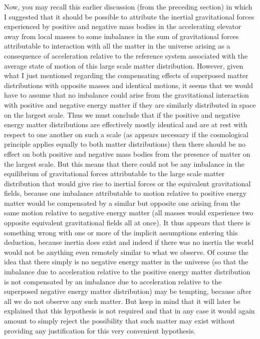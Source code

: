 \documentclass[notitlepage,12pt]{report}
\begin{document}
Now, you may recall this earlier discussion (from the preceding section) in which I suggested that it should be possible to attribute the inertial gravitational forces experienced by positive and negative mass bodies in the accelerating elevator away from local masses to some imbalance in the sum of gravitational forces attributable to interaction with all the matter in the universe arising as a consequence of acceleration relative to the reference system associated with the average state of motion of this large scale matter distribution. However, given what I just mentioned regarding the compensating effects of superposed matter distributions with opposite masses and identical motions, it seems that we would have to assume that no imbalance could arise from the gravitational interaction with positive and negative energy matter if they are similarly distributed in space on the largest scale. Thus we must conclude that if the positive and negative energy matter distributions are effectively mostly identical and are at rest with respect to one another on such a scale (as appears necessary if the cosmological principle applies equally to both matter distributions) then there should be no effect on both positive and negative mass bodies from the presence of matter on the largest scale. But this means that there could not be any imbalance in the equilibrium of gravitational forces attributable to the large scale matter distribution that would give rise to inertial forces or the equivalent gravitational fields, because one imbalance attributable to motion relative to positive energy matter would be compensated by a similar but opposite one arising from the same motion relative to negative energy matter (all masses would experience two opposite equivalent gravitational fields all at once). It thus appears that there is something wrong with one or more of the implicit assumptions entering this deduction, because inertia does exist and indeed if there was no inertia the world would not be anything even remotely similar to what we observe. Of course the idea that there simply is no negative energy matter in the universe (so that the imbalance due to acceleration relative to the positive energy matter distribution is not compensated by an imbalance due to acceleration relative to the superposed negative energy matter distribution) may be tempting, because after all we do not observe any such matter. But keep in mind that it will later be explained that this hypothesis is not required and that in any case it would again amount to simply reject the possibility that such matter may exist without providing any justification for this very convenient hypothesis.
\end{document}
